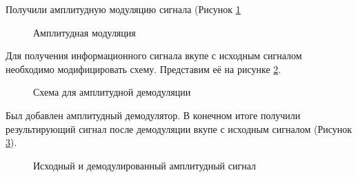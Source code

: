 \documentclass[a4paper,14pt]{extarticle}
\begin{document}
Получили амплитудную модуляцию сигнала (Рисунок \ref{3}

\begin{figure}[H]
\caption{Амплитудная модуляция}
\label{3}
\end{figure}

Для получения информационного сигнала вкупе с исходным сигналом необходимо модифицировать схему. Представим её на рисунке \ref{4}.

\begin{figure}[H]
\caption{Схема для амплитудной демодуляции}
\label{4}
\end{figure}

Был добавлен амплитудный демодулятор. В конечном итоге получили результирующий сигнал после демодуляции вкупе с исходным сигналом (Рисунок \ref{5}).

\begin{figure}[H]
\caption{Исходный и демодулированный амплитудный сигнал}
\label{5}
\end{figure}
\end{document}

